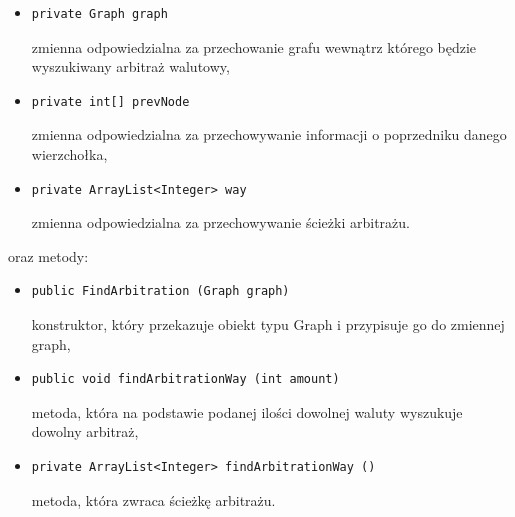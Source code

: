 ﻿\documentclass[12pt]{article}
\begin{document}
\begin{enumerate}
    \begin{itemize}
        \item \begin{verbatim}private Graph graph\end{verbatim}
        zmienna odpowiedzialna za przechowanie grafu wewnątrz którego będzie wyszukiwany arbitraż walutowy,
    \item \begin{verbatim}private int[] prevNode\end{verbatim}
        zmienna odpowiedzialna za przechowywanie informacji o poprzedniku danego wierzchołka,
    \item \begin{verbatim}private ArrayList<Integer> way \end{verbatim}
        zmienna odpowiedzialna za przechowywanie ścieżki arbitrażu.
    \end{itemize}
    oraz metody:
    \begin{itemize}
        \item \begin{verbatim}public FindArbitration (Graph graph)\end{verbatim}
        konstruktor, który przekazuje obiekt typu Graph i przypisuje go do zmiennej graph,
         \item \begin{verbatim}public void findArbitrationWay (int amount)\end{verbatim}
        metoda, która na podstawie podanej ilości dowolnej waluty wyszukuje dowolny arbitraż,
         \item \begin{verbatim}private ArrayList<Integer> findArbitrationWay ()\end{verbatim}
        metoda, która zwraca ścieżkę arbitrażu.
        

\end{itemize}
\end{enumerate}
\end{document}

